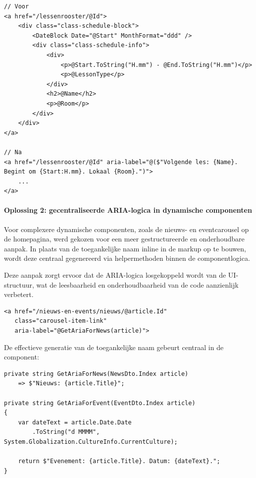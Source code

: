 \begin{listing}[H]
\begin{verbatim}
// Voor
<a href="/lessenrooster/@Id">
    <div class="class-schedule-block">
        <DateBlock Date="@Start" MonthFormat="ddd" />
        <div class="class-schedule-info">
            <div>
                <p>@Start.ToString("H.mm") - @End.ToString("H.mm")</p>
                <p>@LessonType</p>
            </div>
            <h2>@Name</h2>
            <p>@Room</p>
        </div>
    </div>
</a>

// Na
<a href="/lessenrooster/@Id" aria-label="@($"Volgende les: {Name}. Begint om {Start:H.mm}. Lokaal {Room}.")">
    ...
</a>
\end{verbatim}
\caption{Gebruik van contextspecifieke aria-labels.}
\label{lst:aria-label-dynamisch}
\end{listing}

\paragraph{Oplossing 2: gecentraliseerde ARIA-logica in dynamische componenten}

Voor complexere dynamische componenten, zoals de nieuws- en eventcarousel op de homepagina, werd gekozen voor een meer gestructureerde en onderhoudbare aanpak. In plaats van de toegankelijke naam inline in de markup op te bouwen, wordt deze centraal gegenereerd via helpermethoden binnen de componentlogica.

Deze aanpak zorgt ervoor dat de ARIA-logica losgekoppeld wordt van de UI-structuur, wat de leesbaarheid en onderhoudbaarheid van de code aanzienlijk verbetert.

\begin{listing}[H]
\begin{verbatim}
<a href="/nieuws-en-events/nieuws/@article.Id"
   class="carousel-item-link"
   aria-label="@GetAriaForNews(article)">
\end{verbatim}
\caption{Gebruik van een helpermethode voor het genereren van een toegankelijke naam in de nieuws-carousel.}
\label{lst:aria-helper-news}
\end{listing}

De effectieve generatie van de toegankelijke naam gebeurt centraal in de component:

\begin{listing}[H]
\begin{verbatim}
private string GetAriaForNews(NewsDto.Index article)
    => $"Nieuws: {article.Title}";

private string GetAriaForEvent(EventDto.Index article)
{
    var dateText = article.Date.Date
        .ToString("d MMMM", System.Globalization.CultureInfo.CurrentCulture);

    return $"Evenement: {article.Title}. Datum: {dateText}.";
}
\end{verbatim}
\caption{Centrale generatie van toegankelijke namen voor nieuws- en eventitems.}
\label{lst:aria-helper-methods}
\end{listing}

